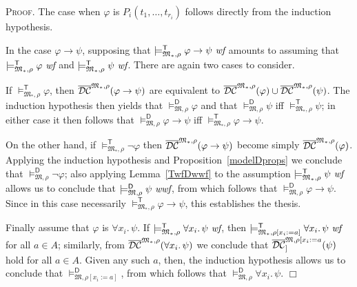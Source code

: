 \documentclass{article}
\newenvironment{proof}{\smallskip\textsc{Proof.}}{\hspace*{\fill}$\Box$}
\newcommand{\modelfunm}[1]{\ensuremath{\mathfrak{#1}_\ast}}
\newcommand{\modelfun}[1]{\ensuremath{{#1}_\ast}}
\newcommand{\wf}{\ \mbox{\em wf}}
\newcommand{\wwf}{\ \mbox{\em wwf}}
\newcommand{\mymodelss}[3]{\ensuremath{\models_{\mathfrak{#2},{#3}}^{\mathsf{#1}}}}
\newcommand{\semDC}[2][{\mathfrak M},\rho]{\ensuremath{\overline{\cal{DC}}^{#1}_{#2}}}
\newcommand{\semDCa}[1]{\semDC[{\modelfunm M,\rho}]{#1}}
\def\sep{.\,}
\begin{document}
\begin{proof}
The case when $\varphi$ is $P_i(t_1,\ldots,t_{r_i})$ follows directly
from the induction hypothesis.

In the case $\varphi\to\psi$, supposing that
$\mymodelss{T}{\modelfun M}\rho\varphi\to\psi\wf$ amounts to assuming
that $\mymodelss{T}{\modelfun M}\rho\varphi\wf$ and
$\mymodelss{T}{\modelfun M}\rho\psi\wf$.  There are again two cases to
consider.

If $\mymodelss{T}{\modelfun M}\rho\varphi$, then $\semDCa{}(\varphi\to\psi)$
are equivalent to $\semDCa{}(\varphi)\cup\semDCa{}(\psi)$.  The induction
hypothesis then yields that $\mymodelss{D}M\rho\varphi$ and that
$\mymodelss{D}M\rho\psi$ iff $\mymodelss{T}{\modelfun M}\rho\psi$;
in either case it then follows that $\mymodelss{D}M\rho\varphi\to\psi$
iff $\mymodelss{T}{\modelfun M}\rho\varphi\to\psi$.

On the other hand, if $\mymodelss{T}{\modelfun M}\rho\neg\varphi$ then
$\semDCa{}(\varphi\to\psi)$ become simply $\semDCa{}(\varphi)$.
Applying the induction hypothesis and Proposition~\ref{modelDprops} we
conclude that $\mymodelss{D}M\rho\neg\varphi$; also applying
Lemma~\ref{TwfDwwf} to the assumption
$\mymodelss{T}{\modelfun M}\rho\psi\wf$ allows us to conclude that
$\mymodelss{D}M\rho\psi\wwf$, from which follows that
$\mymodelss{D}M\rho\varphi\to\psi$.  Since in this case necessarily
$\mymodelss{T}{\modelfun M}\rho\varphi\to\psi$, this establishes the
thesis.

Finally assume that $\varphi$ is $\forall x_i\sep\psi$.  If
$\mymodelss{T}{\modelfun M}\rho\forall x_i\sep\psi\wf$, then
$\mymodelss{T}{\modelfun M}{\rho[x_i:=a]}\forall x_i\sep\psi\wf$ for all
$a\in A$; similarly, from $\semDCa{}(\forall x_i\sep\psi)$ we conclude
that $\semDC[{\mathfrak M},\rho[x_i:=a]]{}(\psi)$ hold for all $a\in A$.
Given any such $a$, then, the induction hypothesis allows us to conclude
that $\mymodelss{D}M{\rho[x_i:=a]}$, from which follows that
$\mymodelss{D}M\rho\forall x_i\sep\psi$.
\end{proof}
\end{document}
